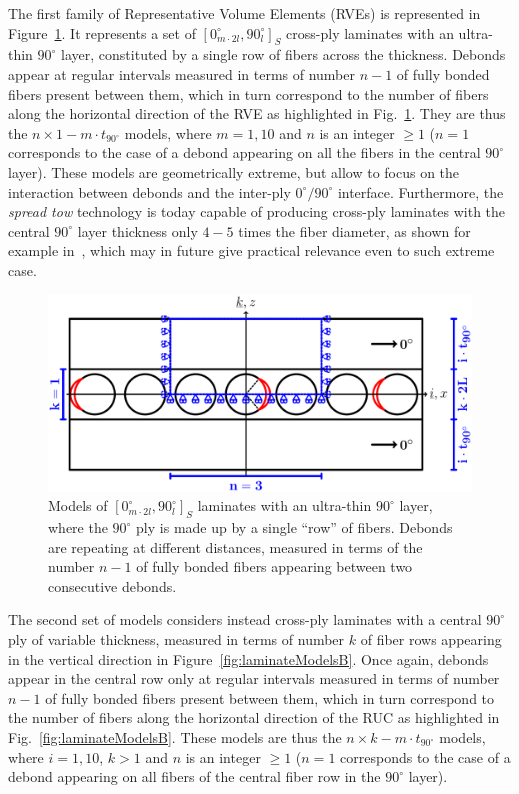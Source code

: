 \documentclass[review]{elsarticle}
\begin{document}
The first family of Representative Volume Elements (RVEs) is represented in Figure~\ref{fig:laminateModelsA}. It represents a set of $\left[0_{m\cdot2l}^{\circ},90_{l}^{\circ}\right]_{S}$ cross-ply laminates with an ultra-thin $90^{\circ}$ layer, constituted by a single row of fibers across the thickness. Debonds appear at regular intervals measured in terms of number $n-1$ of fully bonded fibers present between them, which in turn correspond to the number of fibers along the horizontal direction of the RVE as highlighted in Fig.~\ref{fig:laminateModelsA}. They are thus the $n\times1-m\cdot t_{90^{\circ}}$ models, where $m=1,10$ and $n$ is an integer $\geq1$ ($n=1$ corresponds to the case of a debond appearing on all the fibers in the central $90^{\circ}$ layer). These models are geometrically extreme, but allow to focus on the interaction between debonds and the inter-ply $0^{\circ}/90^{\circ}$ interface. Furthermore, the \emph{spread tow} technology is today capable of producing cross-ply laminates with the central $90^{\circ}$ layer thickness only $4-5$ times the fiber diameter, as shown for example in~\cite{Saito2012}, which may in future give practical relevance even to such extreme case.

\begin{figure}[!h]
\centering
  \includegraphics[width=\textwidth]{thinPly.pdf}
\caption{Models of $\left[0_{m\cdot2l}^{\circ},90_{l}^{\circ}\right]_{S}$ laminates with an ultra-thin $90^{\circ}$ layer, where the $90^{\circ}$ ply is made up by a single ``row'' of fibers. Debonds are repeating at different distances, measured in terms of the number $n-1$ of fully bonded fibers appearing between two consecutive debonds.}\label{fig:laminateModelsA}
\end{figure}

The second set of models considers instead cross-ply laminates with a central $90^{\circ}$ ply of variable thickness, measured in terms of number $k$ of fiber rows appearing in the vertical direction in Figure~\ref{fig:laminateModelsB}. Once again, debonds appear in the central row only at regular intervals measured in terms of number $n-1$ of fully bonded fibers present between them, which in turn correspond to the number of fibers along the horizontal direction of the RUC as highlighted in Fig.~\ref{fig:laminateModelsB}. These models are thus the $n\times k-m\cdot t_{90^{\circ}}$ models, where $i=1,10$, $k>1$ and $n$ is an integer $\geq1$ ($n=1$ corresponds to the case of a debond appearing on all fibers of the central fiber row in the $90^{\circ}$ layer).
\end{document}
